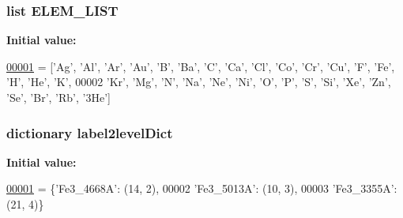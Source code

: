 \subsubsection[{E\+L\+E\+M\+\_\+\+L\+I\+S\+T}]{\setlength{\rightskip}{0pt plus 5cm}list E\+L\+E\+M\+\_\+\+L\+I\+S\+T}\label{namespacepyneb_1_1utils_1_1init_af5a11a312a4ec31ace89027a644a39f2}
{\bfseries Initial value\+:}
\begin{DoxyCode}
\hypertarget{namespacepyneb_1_1utils_1_1init_l00001}{}\hyperlink{namespacepyneb_1_1utils_1_1init}{00001} = [\textcolor{stringliteral}{'Ag'}, \textcolor{stringliteral}{'Al'}, \textcolor{stringliteral}{'Ar'}, \textcolor{stringliteral}{'Au'}, \textcolor{stringliteral}{'B'}, \textcolor{stringliteral}{'Ba'}, \textcolor{stringliteral}{'C'}, \textcolor{stringliteral}{'Ca'}, \textcolor{stringliteral}{'Cl'}, \textcolor{stringliteral}{'Co'}, \textcolor{stringliteral}{'Cr'}, \textcolor{stringliteral}{'Cu'}, \textcolor{stringliteral}{'F'}, \textcolor{stringliteral}{'Fe'}, \textcolor{stringliteral}{'H'}, \textcolor{stringliteral}{'He'}, \textcolor{stringliteral}{'K'},
00002              \textcolor{stringliteral}{'Kr'}, \textcolor{stringliteral}{'Mg'}, \textcolor{stringliteral}{'N'}, \textcolor{stringliteral}{'Na'}, \textcolor{stringliteral}{'Ne'}, \textcolor{stringliteral}{'Ni'}, \textcolor{stringliteral}{'O'}, \textcolor{stringliteral}{'P'}, \textcolor{stringliteral}{'S'}, \textcolor{stringliteral}{'Si'}, \textcolor{stringliteral}{'Xe'}, \textcolor{stringliteral}{'Zn'}, \textcolor{stringliteral}{'Se'}, \textcolor{stringliteral}{'Br'}, \textcolor{stringliteral}{'Rb'}, \textcolor{stringliteral}{'3He'}]
\end{DoxyCode}
\hypertarget{namespacepyneb_1_1utils_1_1init_a4095c9ea31cb082d2a7edae4b74bd55b}{}
\subsubsection[{label2level\+Dict}]{\setlength{\rightskip}{0pt plus 5cm}dictionary label2level\+Dict}\label{namespacepyneb_1_1utils_1_1init_a4095c9ea31cb082d2a7edae4b74bd55b}
{\bfseries Initial value\+:}
\begin{DoxyCode}
\hypertarget{namespacepyneb_1_1utils_1_1init_l00001}{}\hyperlink{namespacepyneb_1_1utils_1_1init}{00001} = \{\textcolor{stringliteral}{'Fe3\_4668A'}: (14, 2), 
00002                    \textcolor{stringliteral}{'Fe3\_5013A'}: (10, 3),
00003                    \textcolor{stringliteral}{'Fe3\_3355A'}: (21, 4)\}
\end{DoxyCode}
\hypertarget{namespacepyneb_1_1utils_1_1init_a2819312869609a6e39b7c8ebd4d1e718}{}
